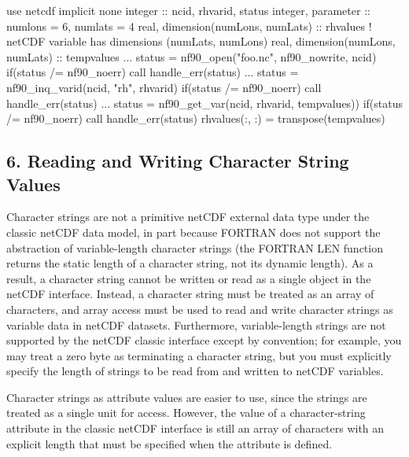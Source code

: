 \begin{DoxyCode}
\textcolor{keywordtype}{use }netcdf
\textcolor{keywordtype}{implicit none}
\textcolor{keywordtype}{integer}                           :: ncid, rhvarid, status
\textcolor{keywordtype}{integer}, \textcolor{keywordtype}{parameter}                :: numlons = 6, numlats = 4
\textcolor{keywordtype}{real}, \textcolor{keywordtype}{dimension(numLons, numLats)} :: rhvalues
\textcolor{comment}{! netCDF variable has dimensions (numLats, numLons)}
\textcolor{keywordtype}{real}, \textcolor{keywordtype}{dimension(numLons, numLats)} :: tempvalues
...
status = nf90\_open(\textcolor{stringliteral}{"foo.nc"}, nf90\_nowrite, ncid)
\textcolor{keywordflow}{if}(status /= nf90\_noerr) \textcolor{keyword}{call }handle\_err(status)
...
status = nf90\_inq\_varid(ncid, \textcolor{stringliteral}{"rh"}, rhvarid)
\textcolor{keywordflow}{if}(status /= nf90\_noerr) \textcolor{keyword}{call }handle\_err(status)
...
status = nf90\_get\_var(ncid, rhvarid, tempvalues))
\textcolor{keywordflow}{if}(status /= nf90\_noerr) \textcolor{keyword}{call }handle\_err(status)
rhvalues(:, :) = transpose(tempvalues)
\end{DoxyCode}
\hypertarget{f90-variables_f90-reading-and-writing-character-string-values}{}\subsection{6. Reading and Writing Character String Values }\label{f90-variables_f90-reading-and-writing-character-string-values}
Character strings are not a primitive net\+C\+DF external data type under the classic net\+C\+DF data model, in part because F\+O\+R\+T\+R\+AN does not support the abstraction of variable-\/length character strings (the F\+O\+R\+T\+R\+AN L\+EN function returns the static length of a character string, not its dynamic length). As a result, a character string cannot be written or read as a single object in the net\+C\+DF interface. Instead, a character string must be treated as an array of characters, and array access must be used to read and write character strings as variable data in net\+C\+DF datasets. Furthermore, variable-\/length strings are not supported by the net\+C\+DF classic interface except by convention; for example, you may treat a zero byte as terminating a character string, but you must explicitly specify the length of strings to be read from and written to net\+C\+DF variables.

Character strings as attribute values are easier to use, since the strings are treated as a single unit for access. However, the value of a character-\/string attribute in the classic net\+C\+DF interface is still an array of characters with an explicit length that must be specified when the attribute is defined.

